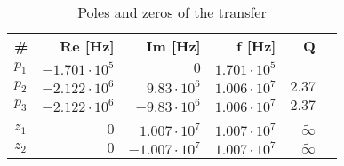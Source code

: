 \begin{table}[H]
\centering
\begin{tabular}[c]{lrrrrr}
\textbf{\#} & \textbf{Re [Hz]} & \textbf{Im [Hz]} & \textbf{f [Hz]} & \textbf{Q} \\ 
\rowcolor{myyellow}
$p_{1}$ &$-1.701 \cdot 10^{5}$ &$0$ &$1.701 \cdot 10^{5}$ \\ 
$p_{2}$ &$-2.122 \cdot 10^{6}$ &$9.83 \cdot 10^{6}$ &$1.006 \cdot 10^{7}$ &$2.37$ \\ 
\rowcolor{myyellow}
$p_{3}$ &$-2.122 \cdot 10^{6}$ &$-9.83 \cdot 10^{6}$ &$1.006 \cdot 10^{7}$ &$2.37$ \\ 
\small{ } \\ 
\rowcolor{myyellow}
$z_{1}$ &$0$ &$1.007 \cdot 10^{7}$ &$1.007 \cdot 10^{7}$ &$\tilde{\infty}$ \\ 
$z_{2}$ &$0$ &$-1.007 \cdot 10^{7}$ &$1.007 \cdot 10^{7}$ &$\tilde{\infty}$ \\ 
\end{tabular}
\caption{Poles and zeros of the transfer}
\label{tab-pz}
\end{table}


